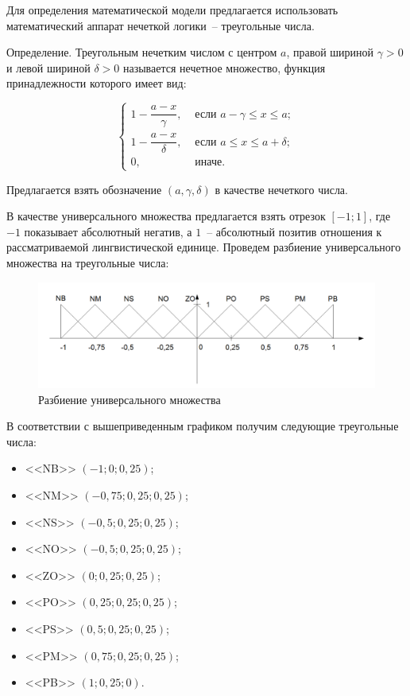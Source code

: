\documentclass[a4paper,14pt,russian]{extreport}
\begin{document}
Для определения математической модели предлагается использовать математический аппарат нечеткой логики~-- треугольные числа.

Определение. Треугольным нечетким числом с центром $a$, правой шириной $\gamma>0$ и левой шириной $\delta>0$ называется нечетное множество, функция принадлежности которого имеет вид:

$$
\left\{
\begin{aligned}
1 - \dfrac{a-x}{\gamma}, &\text{ если } a-\gamma\leq x\leq a; \\
1 - \dfrac{a-x}{\delta}, &\text{ если } a\leq x\leq a+\delta; \\
0, &\text{ иначе}.
\end{aligned}
\right.
$$

Предлагается взять обозначение $\left(a,\gamma, \delta\right)$ в качестве нечеткого числа.

В качестве универсального множества предлагается взять отрезок $\left[-1;1\right]$, где $-1$ показывает абсолютный негатив, а $1$~-- абсолютный позитив отношения к рассматриваемой лингвистической единице. Проведем разбиение универсального множества на треугольные числа:

\newpage

\begin{figure}[h]
\centering
\includegraphics[scale=0.5]{pics/explode.png}
\caption{Разбиение универсального множества}
\label{fig.2}
\end{figure}

В соответствии с вышеприведенным графиком получим следующие треугольные числа:

\begin{itemize}
\item <<NB>> $\left(-1;0;0,25\right)$;
\item <<NM>> $\left(-0,75;0,25;0,25\right)$;
\item <<NS>> $\left(-0,5;0,25;0,25\right)$;
\item <<NO>> $\left(-0,5;0,25;0,25\right)$;
\item <<ZO>> $\left(0;0,25;0,25\right)$;
\item <<PO>> $\left(0,25;0,25;0,25\right)$;
\item <<PS>> $\left(0,5;0,25;0,25\right)$;
\item <<PM>> $\left(0,75;0,25;0,25\right)$;
\item <<PB>> $\left(1;0,25;0\right)$.
\end{itemize}
\end{document}
